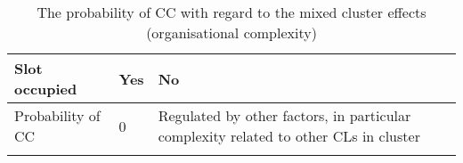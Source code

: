 \begin{table}[t]
\caption{The probability of CC with regard to the mixed cluster effects (organisational complexity)\label{new17.4}}
\begin{tabularx}{\textwidth}{llQ}
\lsptoprule
Slot occupied& Yes & No \\\midrule
Probability of CC & 0 & Regulated by other factors, in particular complexity related to other CLs in cluster\\
\lspbottomrule
\end{tabularx}
\end{table}










